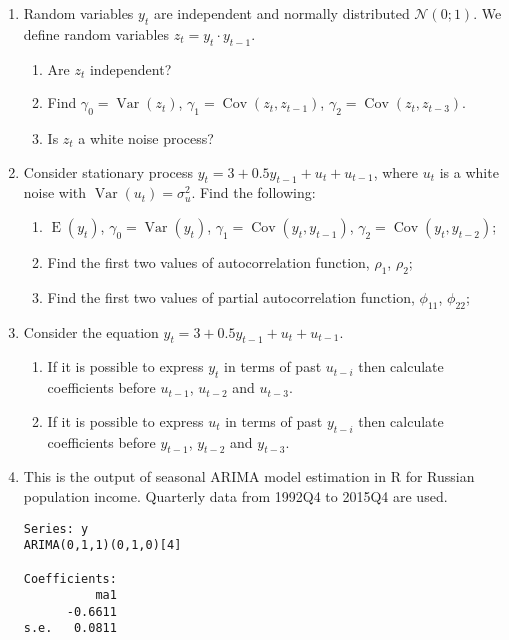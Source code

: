 \documentclass[12pt]{article}
\DeclareMathOperator{\Cov}{Cov}
\DeclareMathOperator{\Var}{Var}
\DeclareMathOperator{\E}{E}
\def \cN{\mathcal{N}}
\begin{document}
\begin{enumerate}


  \item Random variables $y_t$ are independent and normally distributed $\cN(0;1)$. We define random variables $z_t = y_t \cdot y_{t-1}$.
    \begin{enumerate}
      \item Are $z_t$ independent?
      \item Find $\gamma_0 =\Var(z_t)$, $\gamma_1 = \Cov(z_t, z_{t-1})$, $\gamma_2 = \Cov(z_t, z_{t-3})$.
      \item Is $z_t$ a white noise process?
    \end{enumerate}


  \item Consider stationary process $y_t = 3 + 0.5y_{t-1} + u_t + u_{t-1}$, where $u_t$ is a white noise with $\Var(u_t)=\sigma^2_u$. 
    Find the following:
    \begin{enumerate}
      \item $\E(y_t)$, $\gamma_0 = \Var(y_t)$, $\gamma_1 = \Cov(y_t, y_{t-1})$, $\gamma_2 = \Cov(y_t, y_{t-2})$;
      \item Find the first two values of autocorrelation function, $\rho_1$, $\rho_2$;
      \item Find the first two values of partial autocorrelation function, $\phi_{11}$, $\phi_{22}$;
    \end{enumerate}
 


  \item Consider the equation $y_t = 3 + 0.5y_{t-1} + u_t + u_{t-1}$. 
    \begin{enumerate}
      \item If it is possible to express $y_t$ in terms of past $u_{t-i}$ then calculate coefficients before $u_{t-1}$, $u_{t-2}$ and $u_{t-3}$.

      \item If it is possible to express $u_t$ in terms of past $y_{t-i}$ then calculate coefficients before $y_{t-1}$, $y_{t-2}$ and $y_{t-3}$.
    \end{enumerate}


   \item This is the output of seasonal ARIMA model estimation in R for Russian population income.      
     Quarterly data from 1992Q4 to 2015Q4 are used. 
     \begin{verbatim}
Series: y 
ARIMA(0,1,1)(0,1,0)[4] 

Coefficients:
          ma1
      -0.6611
s.e.   0.0811
     \end{verbatim}
     

\end{enumerate}
\end{document}
